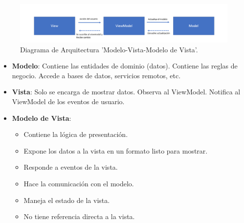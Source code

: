 \begin{figure}[h]
    \centering
    \includegraphics[scale=0.35]{Graphics/Capitulo 3/modelo MVVM.png}
    \caption{Diagrama de Arquitectura 'Modelo-Vista-Modelo de Vista'.} %
    \label{fig:figura14}
\end{figure}

\begin{itemize}
    \item \textbf{Modelo}: Contiene las entidades de dominio (datos). Contiene las reglas de negocio. Accede a bases de datos, servicios remotos, etc.
    \item \textbf{Vista}: Solo se encarga de mostrar datos. Observa al ViewModel. Notifica al ViewModel de los eventos de usuario.
    \item \textbf{Modelo de Vista}:
          \begin{itemize}
              \item Contiene la lógica de presentación.
              \item Expone los datos a la vista en un formato listo para mostrar.
              \item Responde a eventos de la vista.
              \item Hace la comunicación con el modelo.
              \item Maneja el estado de la vista.
              \item No tiene referencia directa a la vista.
          \end{itemize}

\end{itemize}
